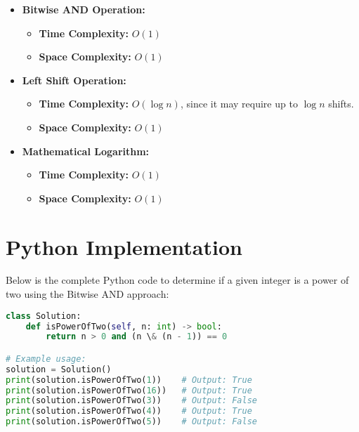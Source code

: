 \begin{itemize}
    \item \textbf{Bitwise AND Operation:}
    \begin{itemize}
        \item \textbf{Time Complexity:} \(O(1)\)
        \item \textbf{Space Complexity:} \(O(1)\)
    \end{itemize}
    
    \item \textbf{Left Shift Operation:}
    \begin{itemize}
        \item \textbf{Time Complexity:} \(O(\log n)\), since it may require up to \(\log n\) shifts.
        \item \textbf{Space Complexity:} \(O(1)\)
    \end{itemize}
    
    \item \textbf{Mathematical Logarithm:}
    \begin{itemize}
        \item \textbf{Time Complexity:} \(O(1)\)
        \item \textbf{Space Complexity:} \(O(1)\)
    \end{itemize}
\end{itemize}

\section*{Python Implementation}


Below is the complete Python code to determine if a given integer is a power of two using the Bitwise AND approach:

\begin{fullwidth}
\begin{lstlisting}[language=Python]
class Solution:
    def isPowerOfTwo(self, n: int) -> bool:
        return n > 0 and (n \& (n - 1)) == 0

# Example usage:
solution = Solution()
print(solution.isPowerOfTwo(1))    # Output: True
print(solution.isPowerOfTwo(16))   # Output: True
print(solution.isPowerOfTwo(3))    # Output: False
print(solution.isPowerOfTwo(4))    # Output: True
print(solution.isPowerOfTwo(5))    # Output: False
\end{lstlisting}
\end{fullwidth}

